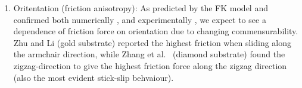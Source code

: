 \begin{enumerate}

  \item Oritentation (friction anisotropy): As predicted by the FK model and confirmed both numerically \cite{zhu_study_2018}, \cite{ma12091425} and experimentally \cite{DIENWIEBEL2005197}, \cite{feng_superlubric_2013} we expect to see a dependence of friction force on orientation due to changing commensurability. Zhu and Li \cite{zhu_study_2018} (gold substrate) reported the highest friction when sliding along the armchair direction, while Zhang et al.\ \cite{ma12091425} (diamond substrate) found the zigzag-direction to give the highest friction force along the zigzag direction (also the most evident stick-slip behvaiour). 
\end{enumerate}
  





